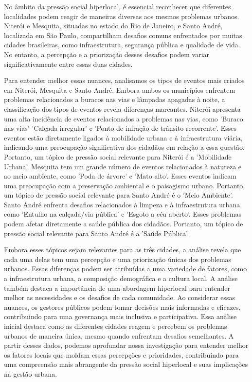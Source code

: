No âmbito da pressão social hiperlocal, é essencial reconhecer que diferentes localidades podem reagir de maneiras diversas aos mesmos problemas urbanos. Niterói e Mesquita, situadas no estado do Rio de Janeiro, e Santo André, localizada em São Paulo, compartilham desafios comuns enfrentados por muitas cidades brasileiras, como infraestrutura, segurança pública e qualidade de vida. No entanto, a percepção e a priorização desses desafios podem variar significativamente entre essas duas cidades.

Para entender melhor essas nuances, analisamos os tipos de eventos mais criados em Niterói, Mesquita e Santo André. Embora ambos os municípios enfrentem problemas relacionados a buracos nas vias e lâmpadas apagadas à noite, a classificação dos tipos de eventos revela diferenças marcantes. Niterói apresenta uma alta incidência de eventos relacionados a problemas nas vias, como 'Buraco nas vias' 'Calçada irregular' e 'Ponto de infração de trânsito recorrente'. Esses eventos estão diretamente ligados à mobilidade urbana e à infraestrutura viária, indicando uma preocupação significativa dos cidadãos em relação a essa questão. Portanto, um tópico de pressão social relevante para Niterói é a 'Mobilidade Urbana'. Mesquita tem um grande número de eventos relacionados à natureza e ao meio ambiente, como 'Poda de árvore' e 'Mato alto'. Esses eventos indicam uma preocupação com a preservação ambiental e o paisagismo urbano. Portanto, um tópico de pressão social relevante para Santo André é o 'Meio Ambiente'. Santo André enfrenta desafios relacionados à limpeza e à infraestrutura urbana, como 'Entulho na calçada/via pública' e 'Esgoto a céu aberto'. Esses problemas podem afetar diretamente a saúde pública dos cidadãos. Portanto, um tópico de pressão social relevante para Santo André é a 'Saúde Pública'.

Embora esses tópicos sejam relevantes para as três cidades, a análise revela que cada uma delas tem uma percepção e uma priorização únicas dos problemas urbanos. Essas diferenças podem ser atribuídas a uma variedade de fatores, como a infraestrutura urbana, a composição demográfica e a cultura local. A análise também destaca a importância de uma abordagem hiperlocal para entender melhor as necessidades e os desafios de cada comunidade. Ao considerar essas nuances, os gestores públicos podem tomar decisões mais informadas e eficazes, contribuindo para uma governança mais inclusiva e participativa. Essa análise inicial destaca como as diferentes cidades reagem e percebem os problemas urbanos de maneira única, mesmo quando enfrentam desafios semelhantes. A partir desses dados, podemos aprofundar nossa investigação para entender melhor os fatores locais que moldam essas percepções e prioridades, contribuindo para uma compreensão mais abrangente da pressão social hiperlocal e suas implicações na gestão urbana.

